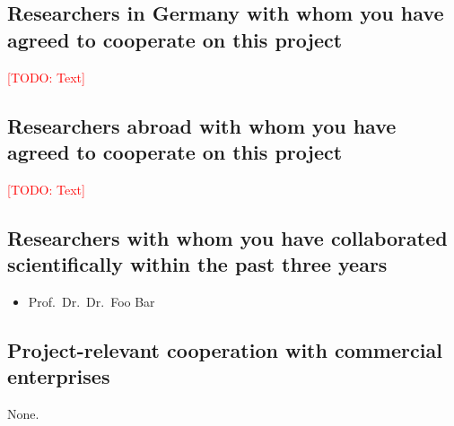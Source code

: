 \documentclass[american,firsttime]{dfgproposal}
\newcommand{\todo}[1]{\xspace{\textcolor{red}{[TODO: #1]}}\xspace}
\begin{document}
	\subsection{Researchers in Germany with whom you have agreed to cooperate on this project}
	\todo{Text}
	
	\subsection{Researchers abroad with whom you have agreed to cooperate on this project}
	\todo{Text}
	
	\subsection{Researchers with whom you have collaborated scientifically within the past three years}
	\begin{itemize}
		\item Prof.\ Dr.\ Dr.\ Foo Bar
	\end{itemize}
	
	\subsection{Project-relevant cooperation with commercial enterprises}
	None.
	
\end{document}
